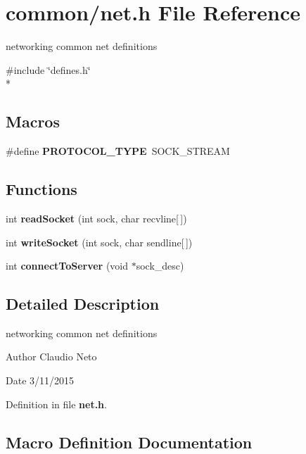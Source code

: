 \section{common/net.h File Reference}
\label{net_8h}


networking common net definitions  


{\ttfamily \#include \char`\"{}defines.\-h\char`\"{}}\\*
\subsection*{Macros}
\begin{DoxyCompactItemize}
\item 
\#define {\bf P\-R\-O\-T\-O\-C\-O\-L\-\_\-\-T\-Y\-P\-E}~S\-O\-C\-K\-\_\-\-S\-T\-R\-E\-A\-M
\end{DoxyCompactItemize}
\subsection*{Functions}
\begin{DoxyCompactItemize}
\item 
int {\bf read\-Socket} (int sock, char recvline[$\,$])
\item 
int {\bf write\-Socket} (int sock, char sendline[$\,$])
\item 
int {\bf connect\-To\-Server} (void $\ast$sock\-\_\-desc)
\end{DoxyCompactItemize}


\subsection{Detailed Description}
networking common net definitions \begin{DoxyAuthor}{Author}
Claudio Neto
\end{DoxyAuthor}
\begin{DoxyDate}{Date}
3/11/2015 
\end{DoxyDate}


Definition in file {\bf net.\-h}.



\subsection{Macro Definition Documentation}
